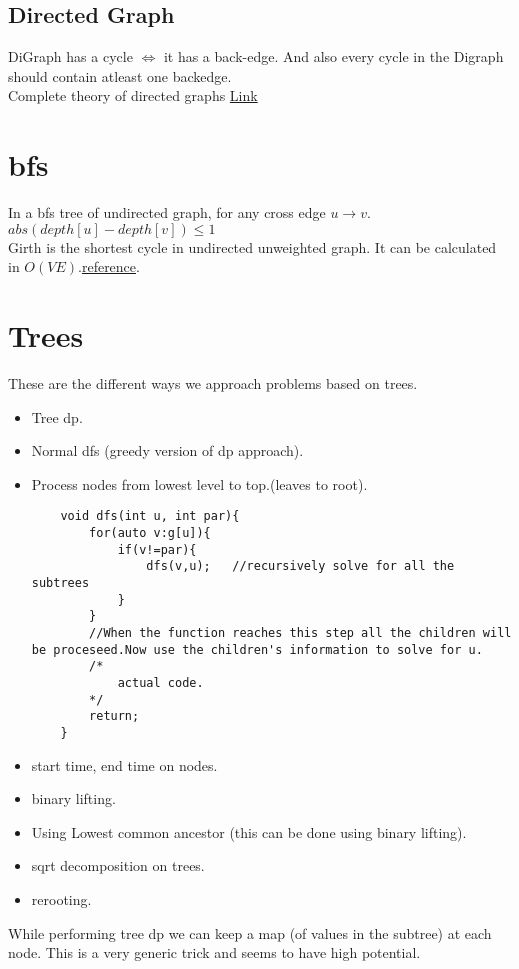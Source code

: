 \documentclass[../Notes.tex]{subfiles}
\begin{document}
\subsection{Directed Graph}

DiGraph has a cycle $\iff$ it has a back-edge. And also every cycle in the Digraph should contain atleast one backedge.\\
Complete theory of directed graphs \href{../Material/Directed Graphs}{Link}

\section{bfs}
In a bfs tree of undirected graph, for any cross edge $u\rightarrow v$. $abs(depth[u]-depth[v])\leq 1$\\

Girth is the shortest cycle in undirected unweighted graph. It can be calculated in $O(VE)$.\href{./Material/Girth.pdf}{reference}.

\section{Trees}

These are the different ways we approach problems based on trees.
\begin{itemize}
	\item Tree dp.
	\item Normal dfs (greedy version of dp approach).
	\item Process nodes from lowest level to top.(leaves to root).
	\begin{lstlisting}
	void dfs(int u, int par){
		for(auto v:g[u]){
			if(v!=par){
				dfs(v,u);	//recursively solve for all the subtrees
			}
		}
		//When the function reaches this step all the children will be proceseed.Now use the children's information to solve for u.
		/*
			actual code.
		*/
		return;
	}
	\end{lstlisting}
	\item start time, end time on nodes.
	\item binary lifting.
	\item Using Lowest common ancestor (this can be done using binary lifting).
	\item sqrt decomposition on trees.
	\item rerooting.
\end{itemize}

While performing tree dp we can keep a map (of values in the subtree) at each node. This is a very generic trick and seems to have high potential.
\end{document}
